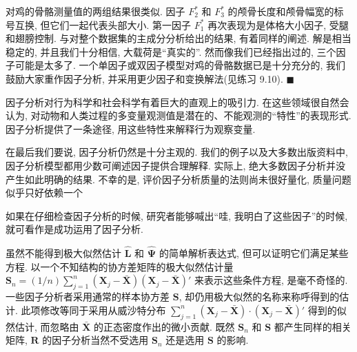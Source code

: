 
对鸡的骨骼测量值的两组结果很类似. 因子 $F_2^{*}$ 和 $F_3^{*}$ 的颅骨长度和颅骨幅宽的标号互换, 但它们一起代表头部大小. 第一因子 $F_1^{*}$ 再次表现为是体格大小因子, 受腿和翅膀控制. 与对整个数据集的主成分分析给出的结果, 有着同样的阐述. 解是相当稳定的, 并且我们十分相信, 大载荷是“真实的”. 然而像我们已经指出过的, 三个因子可能是太多了. 一个单因子或双因子模型对鸡的骨骼数据已是十分充分的, 我们鼓励大家重作因子分析, 并采用更少因子和变换解法(见练习 9.10). \hfill$\blacksquare$

因子分析对行为科学和社会科学有着巨大的直观上的吸引力. 在这些领域很自然会认为, 对动物和人类过程的多变量观测值是潜在的、不能观测的“特性”的表现形式. 因子分析提供了一条途径, 用这些特性来解释行为观察变量.

在最后我们要说, 因子分析仍然是十分主观的. 我们的例子以及大多数出版资料中, 因子分析模型都用少数可阐述因子提供合理解释. 实际上, 绝大多数因子分析并没产生如此明确的结果. 不幸的是, 评价因子分析质量的法则尚未很好量化, 质量问题似乎只好依赖一个

\par\vspace{2pt}{\centering “哇”准则\par}\vspace{2pt}

如果在仔细检查因子分析的时候, 研究者能够喊出“哇, 我明白了这些因子”的时候, 就可看作是成功运用了因子分析.


虽然不能得到极大似然估计 $\hat{\mathbf{L}}$ 和 $\hat{\boldsymbol{\Psi}}$ 的简单解析表达式, 但可以证明它们满足某些方程. 以一个不知结构的协方差矩阵的极大似然估计量 $\mathbf{S}_n=(1/n)\sum\limits_{j=1}^{n}(\mathbf{X}_j-\bar{\mathbf{X}})(\mathbf{X}_j-\bar{\mathbf{X}})'$ 来表示这些条件方程, 是毫不奇怪的. 一些因子分析者采用通常的样本协方差 $\mathbf{S}$, 却仍用极大似然的名称来称呼得到的估计. 此项修改等同于采用从威沙特分布 $\sum\limits_{j=1}^{n}(\mathbf{X}_j-\bar{\mathbf{X}})\cdot(\mathbf{X}_j-\bar{\mathbf{X}})'$ 得到的似然估计, 而忽略由 $\bar{\mathbf{X}}$ 的正态密度作出的微小贡献. 既然 $\mathbf{S}_n$ 和 $\mathbf{S}$ 都产生同样的相关矩阵, $\mathbf{R}$ 的因子分析当然不受选用 $\mathbf{S}_n$ 还是选用 $\mathbf{S}$ 的影响.

